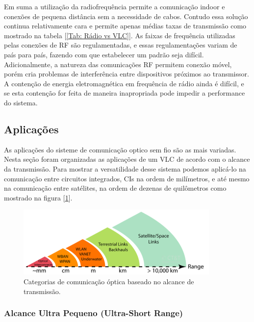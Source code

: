 Em suma a utilização da radiofrequência permite a comunicação indoor e conexões de pequena distância sem a necessidade de cabos. Contudo essa solução continua relativamente cara e permite apenas médias taxas de transmissão como mostrado na tabela [\ref{Tab: Rádio vs VLC}].  As faixas de frequência utilizadas pelas conexões de RF são regulamentadas, e essas regulamentações variam de 
país para país, fazendo com que estabelecer um padrão seja difícil. Adicionalmente, a natureza das comunicações RF permitem conexão móvel, porém cria problemas de interferência entre dispositivos próximos ao transmissor. A contenção de energia eletromagnética em frequência de rádio ainda é difícil, e se esta contenção for feita de maneira inapropriada pode impedir a performance do sistema.

\subsection{Aplicações}

As aplicações do sisteme de comunicação optico sem fio são as mais variadas. Nesta seção foram organizadas as aplicações de um VLC de acordo com o alcance da transmissão. Para mostrar a versatilidade desse sistema podemos aplicá-lo na comunicação entre circuitos integrados, CIs na ordem de milímetros, e até mesmo na comunicação entre satélites, na ordem de dezenas de quilômetros como mostrado na figura [\ref{Fig: faixas-de-alcance}].

\begin{figure}
	\centering
		\includegraphics[width = 10cm]{figuras/faixas-de-alcance}
	\caption{Categorias de comunicação óptica baseado no alcance de transmissão.}
	\label{Fig: faixas-de-alcance}
\end{figure}

\subsubsection{Alcance Ultra Pequeno (Ultra-Short Range)}

